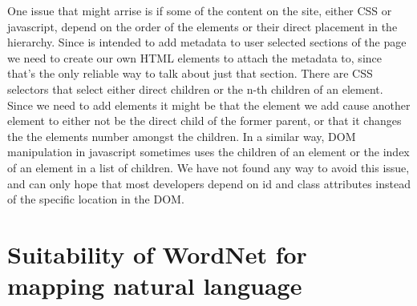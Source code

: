 One issue that might arrise is if some of the content on the site, either CSS or javascript,
depend on the order of the elements or their direct placement in the hierarchy.
Since \theartefact is intended to add metadata to user selected sections of the page we need to create our own
HTML elements to attach the metadata to, since that's the only reliable way to talk about just that section.
There are CSS selectors that select either direct children or the n-th children of an element.
Since we need to add elements it might be that the element we add cause another element to either not be the direct
child of the former parent, or that it changes the the elements number amongst the children.
In a similar way, DOM manipulation in javascript sometimes uses the children of an element or the index of an element
in a list of children.
We have not found any way to avoid this issue,
and can only hope that most developers depend on id and class attributes instead of the specific location in the DOM.

\section{Suitability of WordNet for mapping natural language}

